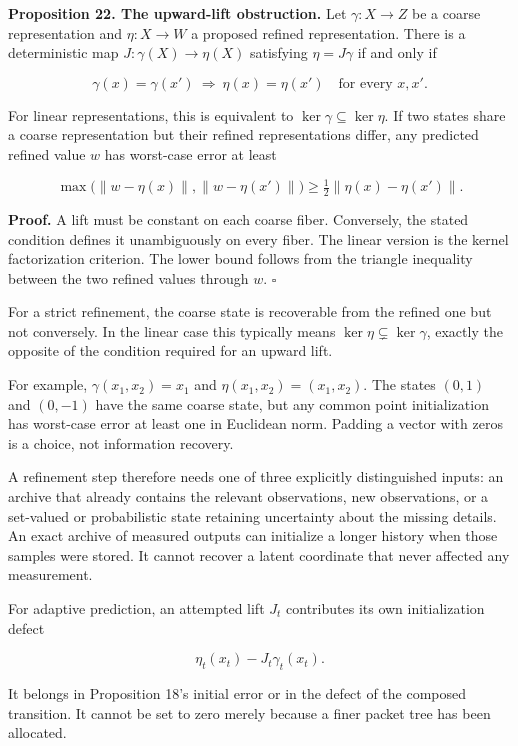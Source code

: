 \documentclass[11pt,letterpaper]{article}
\begin{document}
\textbf{Proposition 22. The upward-lift obstruction.} Let
\(\gamma:X\to Z\) be a coarse representation and \(\eta:X\to W\) a
proposed refined representation. There is a deterministic map
\(J:\gamma(X)\to\eta(X)\) satisfying \(\eta=J\gamma\) if and only if

\[
\gamma(x)=\gamma(x')\ \Longrightarrow\ \eta(x)=\eta(x')
\quad\text{for every }x,x'.
\]

For linear representations, this is equivalent to
\(\ker\gamma\subseteq\ker\eta\). If two states share a coarse
representation but their refined representations differ, any predicted
refined value \(w\) has worst-case error at least

\[
\max\bigl(\|w-\eta(x)\|,\|w-\eta(x')\|\bigr)
\geq\tfrac12\|\eta(x)-\eta(x')\|.
\]

\textbf{Proof.} A lift must be constant on each coarse fiber.
Conversely, the stated condition defines it unambiguously on every
fiber. The linear version is the kernel factorization criterion. The
lower bound follows from the triangle inequality between the two refined
values through \(w\). \(\square\)

For a strict refinement, the coarse state is recoverable from the
refined one but not conversely. In the linear case this typically means
\(\ker\eta\subsetneq\ker\gamma\), exactly the opposite of the condition
required for an upward lift.

For example, \(\gamma(x_1,x_2)=x_1\) and \(\eta(x_1,x_2)=(x_1,x_2)\).
The states \((0,1)\) and \((0,-1)\) have the same coarse state, but any
common point initialization has worst-case error at least one in
Euclidean norm. Padding a vector with zeros is a choice, not information
recovery.

A refinement step therefore needs one of three explicitly distinguished
inputs: an archive that already contains the relevant observations, new
observations, or a set-valued or probabilistic state retaining
uncertainty about the missing details. An exact archive of measured
outputs can initialize a longer history when those samples were stored.
It cannot recover a latent coordinate that never affected any
measurement.

For adaptive prediction, an attempted lift \(J_t\) contributes its own
initialization defect

\[
\eta_t(x_t)-J_t\gamma_t(x_t).
\]

It belongs in Proposition 18's initial error or in the defect of the
composed transition. It cannot be set to zero merely because a finer
packet tree has been allocated.
\end{document}
